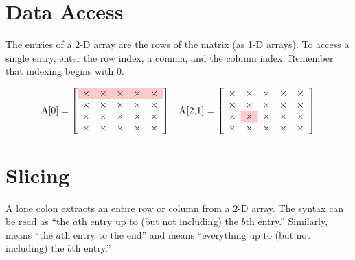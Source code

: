 \label{appendix:numpy-visual-guide}

\section*{Data Access} %

The entries of a 2-D array are the rows of the matrix (as 1-D arrays).
To access a single entry, enter the row index, a comma, and the column index.
Remember that indexing begins with $0$.

\begin{align*}
\text{\li{A[0]}} = \left[\begin{array}{rrrrr}
\rowcolor{red!20}
\times & \times & \times & \times & \times\\
\times & \times & \times & \times & \times\\
\times & \times & \times & \times & \times\\
\times & \times & \times & \times & \times\\
\end{array}\right]
&&
\text{\li{A[2,1]}} = \left[\begin{array}{rrrrr}
\times & \times & \times & \times & \times\\
\times & \times & \times & \times & \times\\
\times & \cellcolor{red!20} \times & \times & \times & \times\\
\times & \times & \times & \times & \times
\end{array}\right]
\end{align*}

\section*{Slicing} %

A lone colon extracts an entire row or column from a 2-D array.
The syntax \li{[a:b]} can be read as ``the $a$th entry up to (but not including) the $b$th entry.''
Similarly, \li{[a:]} means ``the $a$th entry to the end'' and \li{[:b]} means ``everything up to (but not including) the $b$th entry.''

